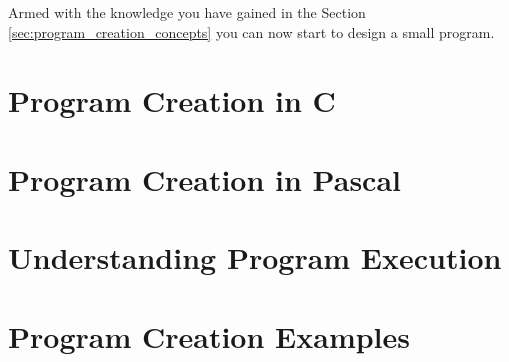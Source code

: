 Armed with the knowledge you have gained in the Section \ref{sec:program_creation_concepts} you can now start to design a small program.





\clearpage
\def\pageLang{c}
\section{Program Creation in C}
\label{sec:program-creation-in-c}














\clearpage
\def\pageLang{pas}
\section{Program Creation in Pascal}
\label{sec:program-creation-in-pas}


\clearpage
\def\pageLang{none}
\section{Understanding Program Execution} %
\label{sec:understanding_program_execution}




\clearpage
\section{Program Creation Examples} %
\label{sec:program_creation_examples}

